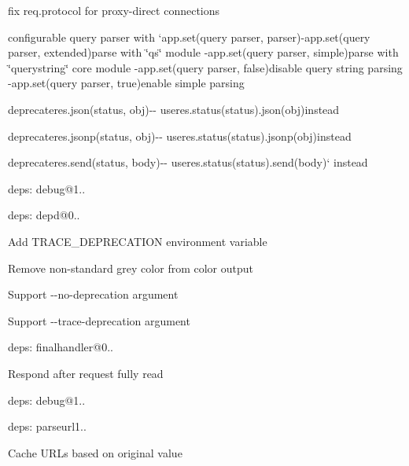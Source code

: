 \begin{DoxyItemize}
\item fix {\ttfamily req.\+protocol} for proxy-\/direct connections
\item configurable query parser with `app.set(\textquotesingle{}query parser\textquotesingle{}, parser){\ttfamily  -\/}app.\+set(\textquotesingle{}query parser\textquotesingle{}, \textquotesingle{}extended\textquotesingle{}){\ttfamily parse with \char`\"{}qs\char`\"{} module -\/}app.\+set(\textquotesingle{}query parser\textquotesingle{}, \textquotesingle{}simple\textquotesingle{}){\ttfamily parse with \char`\"{}querystring\char`\"{} core module -\/}app.\+set(\textquotesingle{}query parser\textquotesingle{}, false){\ttfamily disable query string parsing -\/}app.\+set(\textquotesingle{}query parser\textquotesingle{}, true){\ttfamily enable simple parsing}
\item {\ttfamily deprecate}res.\+json(status, obj){\ttfamily -\/-\/ use}res.\+status(status).json(obj){\ttfamily instead}
\item {\ttfamily deprecate}res.\+jsonp(status, obj){\ttfamily -\/-\/ use}res.\+status(status).jsonp(obj){\ttfamily instead}
\item {\ttfamily deprecate}res.\+send(status, body){\ttfamily -\/-\/ use}res.\+status(status).send(body)` instead
\item deps\+: debug@1..
\item deps\+: depd@0..
\begin{DoxyItemize}
\item Add {\ttfamily T\+R\+A\+C\+E\+\_\+\+D\+E\+P\+R\+E\+C\+A\+T\+I\+O\+N} environment variable
\item Remove non-\/standard grey color from color output
\item Support {\ttfamily -\/-\/no-\/deprecation} argument
\item Support {\ttfamily -\/-\/trace-\/deprecation} argument
\end{DoxyItemize}
\item deps\+: finalhandler@0..
\begin{DoxyItemize}
\item Respond after request fully read
\item deps\+: debug@1..
\end{DoxyItemize}
\item deps\+: parseurl1..
\begin{DoxyItemize}
\item Cache U\+R\+Ls based on original value

\end{DoxyItemize}
\end{DoxyItemize}
